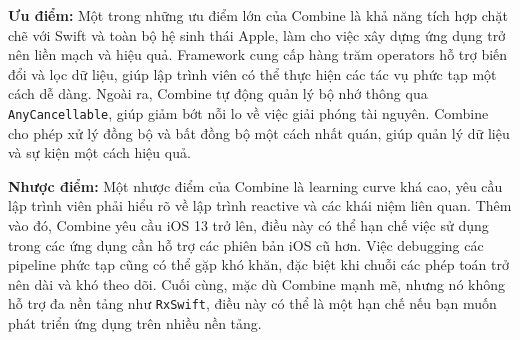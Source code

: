 \vspace{0.5em}

\textbf{Ưu điểm:} Một trong những ưu điểm lớn của Combine là khả năng tích hợp chặt chẽ với Swift và toàn bộ hệ sinh thái Apple, làm cho việc xây dựng ứng dụng trở nên liền mạch và hiệu quả. Framework cung cấp hàng trăm operators hỗ trợ biến đổi và lọc dữ liệu, giúp lập trình viên có thể thực hiện các tác vụ phức tạp một cách dễ dàng. Ngoài ra, Combine tự động quản lý bộ nhớ thông qua \texttt{AnyCancellable}, giúp giảm bớt nỗi lo về việc giải phóng tài nguyên. Combine cho phép xử lý đồng bộ và bất đồng bộ một cách nhất quán, giúp quản lý dữ liệu và sự kiện một cách hiệu quả.

\vspace{0.5em}

\textbf{Nhược điểm:} Một nhược điểm của Combine là learning curve khá cao, yêu cầu lập trình viên phải hiểu rõ về lập trình reactive và các khái niệm liên quan. Thêm vào đó, Combine yêu cầu iOS 13 trở lên, điều này có thể hạn chế việc sử dụng trong các ứng dụng cần hỗ trợ các phiên bản iOS cũ hơn. Việc debugging các pipeline phức tạp cũng có thể gặp khó khăn, đặc biệt khi chuỗi các phép toán trở nên dài và khó theo dõi. Cuối cùng, mặc dù Combine mạnh mẽ, nhưng nó không hỗ trợ đa nền tảng như \texttt{RxSwift}, điều này có thể là một hạn chế nếu bạn muốn phát triển ứng dụng trên nhiều nền tảng.